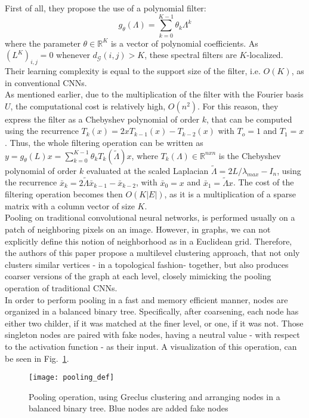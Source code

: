  First of all, they propose the use of a polynomial filter:\\
\begin{equation}
g_{\theta}(\Lambda ) = \sum_{k=0}^{K-1}\theta_k \Lambda^k
\end{equation}
where the parameter $\theta \in \mathbb{R}^K$ is a vector of polynomial
coefficients. As $(L^K)_{i,j} = 0$ whenever $d_{\mathcal{G}}(i,j)>K$, these
spectral filters are $K$-localized.\\

 Their learning complexity is equal to the support
size of the filter, i.e. $O(K)$, as in conventional CNNs.\\

 As mentioned earlier, due to the
multiplication of the filter with the Fourier basis $U$, the computational cost
is relatively high, $O(n^2)$. For this reason, they express the filter as a
Chebyshev polynomial of order $k$, that can be computed using the recurrence
$T_k(x) = 2xT_{k-1}(x)-T_{k-2}(x)$ with $T_o = 1$ and $T_1 = x$. Thus, the whole
filtering operation can be written as $y = g_{\theta}(L)x =
\sum_{k=0}^{K-1}\theta_k T_k (\widetilde{\Lambda })x$, where $T_k (\Lambda ) \in
\mathbb{R}^{nxn}$ is the Chebyshev polynomial of order $k$ evaluated at the
scaled Laplacian $\widetilde{\Lambda} = 2L/\lambda_{max} - I_n$, using the
recurrence $\bar{x}_k = 2\widetilde{\Lambda}\bar{x}_{k-1} - \bar{x}_{k-2}$, with
$\bar{x}_0 = x$ and $\bar{x}_1 = \widetilde{\Lambda}x$. The cost of the
filtering operation becomes then $O(K|E|)$, as it is a multiplication of a
sparse matrix with a column vector of size $K$.\\

Pooling on traditional convolutional neural networks, is performed usually on a
patch of neighboring pixels on an image. However, in graphs, we can not explicitly
define this notion of neighborhood as in a Euclidean grid. Therefore, the authors of
this paper propose a multilevel clustering approach, that not only clusters
similar vertices - in a topological fashion- together, but also produces coarser
versions of the graph at each level, closely mimicking the pooling operation of traditional
CNNs.\\
In order to perform pooling in a fast and memory efficient manner, nodes are
organized in a balanced binary tree. Specifically, after coarsening, each node
has either two childer, if it was matched at the finer level, or one, if it was
not. Those singleton nodes are paired with fake nodes, having a neutral value
- with respect to the activation function - as their input. A visualization of this
operation, can be seen in Fig.~\ref{pooldef}.
\begin{figure}
\texttt{[image: pooling\_def]}
\caption{Pooling operation, using Greclus clustering and arranging nodes in a
balanced binary tree. Blue nodes are added fake nodes}
\label{pooldef}
\end{figure}
